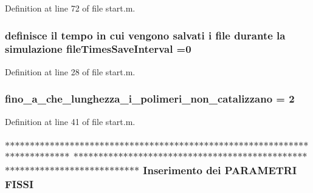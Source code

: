 Definition at line 72 of file start.\+m.

\hypertarget{a00113_a825ee95e200498001c9f82b9637c1ff5}{
\subsubsection[{file\+Times\+Save\+Interval}]{\setlength{\rightskip}{0pt plus 5cm}definisce il tempo in cui vengono salvati {\bf i} {\bf file} durante la {\bf simulazione} file\+Times\+Save\+Interval =0}}\label{a00113_a825ee95e200498001c9f82b9637c1ff5}


Definition at line 28 of file start.\+m.

\hypertarget{a00113_ab6966d9ee620bc7376dc41a38352b948}{
\subsubsection[{fino\+\_\+a\+\_\+che\+\_\+lunghezza\+\_\+i\+\_\+polimeri\+\_\+non\+\_\+catalizzano}]{\setlength{\rightskip}{0pt plus 5cm}fino\+\_\+a\+\_\+che\+\_\+lunghezza\+\_\+i\+\_\+polimeri\+\_\+non\+\_\+catalizzano = 2}}\label{a00113_ab6966d9ee620bc7376dc41a38352b948}


Definition at line 41 of file start.\+m.

\hypertarget{a00113_aea8a3181c0f6f0f47e51930921720484}{
\subsubsection[{F\+I\+S\+S\+I}]{\setlength{\rightskip}{0pt plus 5cm}$\ast$$\ast$$\ast$$\ast$$\ast$$\ast$$\ast$$\ast$$\ast$$\ast$$\ast$$\ast$$\ast$$\ast$$\ast$$\ast$$\ast$$\ast$$\ast$$\ast$$\ast$$\ast$$\ast$$\ast$$\ast$$\ast$$\ast$$\ast$$\ast$$\ast$$\ast$$\ast$$\ast$$\ast$$\ast$$\ast$$\ast$$\ast$$\ast$$\ast$$\ast$$\ast$$\ast$$\ast$$\ast$$\ast$$\ast$$\ast$$\ast$$\ast$$\ast$$\ast$$\ast$$\ast$$\ast$$\ast$$\ast$$\ast$$\ast$$\ast$$\ast$$\ast$$\ast$$\ast$$\ast$$\ast$$\ast$$\ast$$\ast$$\ast$$\ast$$\ast$$\ast$$\ast$ $\ast$$\ast$$\ast$$\ast$$\ast$$\ast$$\ast$$\ast$$\ast$$\ast$$\ast$$\ast$$\ast$$\ast$$\ast$$\ast$$\ast$$\ast$$\ast$$\ast$$\ast$$\ast$$\ast$$\ast$$\ast$$\ast$$\ast$$\ast$$\ast$$\ast$$\ast$$\ast$$\ast$$\ast$$\ast$$\ast$$\ast$$\ast$$\ast$$\ast$$\ast$$\ast$$\ast$$\ast$$\ast$$\ast$$\ast$$\ast$$\ast$$\ast$$\ast$$\ast$$\ast$$\ast$$\ast$$\ast$$\ast$$\ast$$\ast$$\ast$$\ast$$\ast$$\ast$$\ast$$\ast$$\ast$$\ast$$\ast$$\ast$$\ast$$\ast$$\ast$$\ast$$\ast$ Inserimento dei P\+A\+R\+A\+M\+E\+T\+R\+I F\+I\+S\+S\+I}}\label{a00113_aea8a3181c0f6f0f47e51930921720484}


